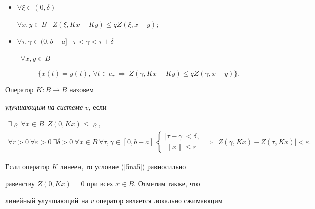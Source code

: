 \begin{itemize}


\item[1)] $\forall \xi\in (0, \delta)$ \,


$\forall x, y\in B$ \ $Z(\xi,K x-K y) \leqslant q Z(\xi, x-y)$;


\item[2)] $\forall \tau,\gamma\in (0, b-a]$ \ $\tau<\gamma<\tau+\delta$


\ $\forall x, y\in B$


$$


\{x(t)=y(t), \ \forall t\in e_\tau


\ \Rightarrow \ Z(\gamma,K x-K y) \leqslant q Z(\gamma, x- y) \}.


$$


\end{itemize}





Оператор $K:B \to B$ назовем


{\it улучшающим на системе} $v$, если


\begin{gather}\label{5na5}


\exists \varrho \ \forall x\in B \; \ Z(0,K x)\leqslant \varrho, \\


%


\label{5na6}


\forall r>0 \ \forall \varepsilon>0


\ \exists \delta>0 \ \forall x\in


B \ \forall \tau,\gamma\in [0,b-a]


\ \begin{cases}


|\tau-\gamma|<\delta,\\


\| x \|\leqslant r


\end{cases}\, \Rightarrow \, |Z(\gamma,K x)-Z(\tau, K x)|<\varepsilon.


\end{gather}





Если оператор $K$ линеен, то условие (\ref{5na5}) равносильно


равенству $Z(0,K x)=0$ при всех $ x\in B$. Отметим также, что


линейный улучшающий на $v$ оператор является локально сжимающим


